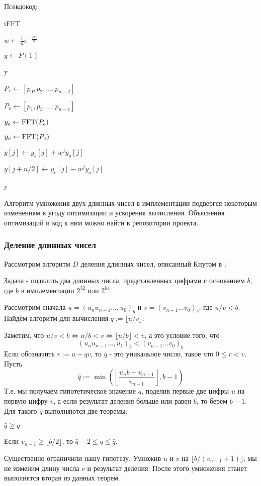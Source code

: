\documentclass{article}
\begin{document}
  Псевдокод:

    \begin{algorithm}[H]
        \caption{iFFT}
        $w\gets \frac{1}{n}e^{-\frac{2\pi i}{n}}$

         {
          $y\gets P(1)$

          \Return y
        }

        $P_e\gets [p_0,p_2,\dots,p_{n-2}]$

        $P_o\gets [p_1,p_3,\dots,p_{n-1}]$

        $y_e\gets {\rm FFT}(P_e)$

        $y_o\gets {\rm FFT}(P_o)$

         {
          $y[j]\gets y_e[j] + w^jy_o[j]$

          $y[j + n/2]\gets y_e[j] - w^jy_o[j]$
        }

        \Return y
      \end{algorithm}

  Алгоритм умножения двух длинных чисел в имплементации подвергся некоторым изменениям в угоду оптимизации и ускорения вычисления. Объяснения оптимизаций и код к ним можно найти в репозитории проекта.
  \subsubsection{Деление длинных чисел}
   Рассмотрим алгоритм $D$ деления длинных чисел, описанный Кнутом в \cite{knuth2014art}:

   Задача - поделить два длинных числа, представленных цифрами с основанием $b$, где $b$ в имплементации $2^{32}$ или $2^{64}$. 

   Рассмотрим сначала $u=(u_nu_{n-1}\dots,u_0)_b$ и $v=(v_{n-1}\dots v_0)_b$, где $u/v <b$. Найдём алгоритм для вычисления $q:=\lfloor u/v \rfloor$:

   Заметим, что $u/v<b\Leftrightarrow u/b < v\Leftrightarrow \lfloor u/b\rfloor < v$, а это условие того, что \[(u_nu_{n-1}\dots,u_1)_b <  (v_{n-1}\dots v_0)_b\]
   Если обозначить $r:=u - qv$, то $q$ - это уникальное число, такое что $0\leqslant r <v$. Пусть
   \[\hat{q}:=\min \left(\left\lfloor \frac{u_nb + u_{n-1}}{v_{n-1}}\right\rfloor, b-1\right)\]
   Т.е. мы получаем гипотетическое значение $q$, поделив первые две цифры $u$ на первую цифру $v$, а если результат деления больше или равен $b$, то берём $b-1$. Для такого $\hat{q}$ выполняются две теоремы: 
   \begin{theorem}
    $\hat{q}\geqslant q$
   \end{theorem}
   \begin{theorem}
     Если $v_{n-1}\geqslant \lfloor b/2\rfloor$, то $\hat{q}-2\leqslant q\leqslant \hat{q}$.
   \end{theorem}
   Существенно ограничили нашу гипотезу. Умножив $u$ и $v$ на $\lfloor b/(v_{n-1}+1)\rfloor$, мы не изменим длину числа $v$ и результат деления. После этого умножения станет выполнятся вторая из данных теорем.
\end{document}
